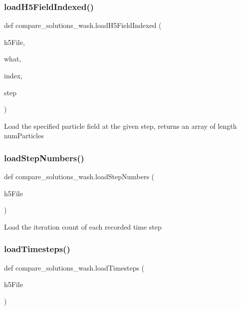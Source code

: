 \subsubsection{\texorpdfstring{load\+H5\+Field\+Indexed()}{loadH5FieldIndexed()}}
{\footnotesize\ttfamily def compare\+\_\+solutions\+\_\+wash.\+load\+H5\+Field\+Indexed (\begin{DoxyParamCaption}\item[{}]{h5\+File,  }\item[{}]{what,  }\item[{}]{index,  }\item[{}]{step }\end{DoxyParamCaption})}

\begin{DoxyVerb}Load the specified particle field at the given step, returns an array of length numParticles \end{DoxyVerb}
 \mbox{\label{namespacecompare__solutions__wash_a13dfad6bbc2ba1a437ee77253075b68a}} 
\subsubsection{\texorpdfstring{load\+Step\+Numbers()}{loadStepNumbers()}}
{\footnotesize\ttfamily def compare\+\_\+solutions\+\_\+wash.\+load\+Step\+Numbers (\begin{DoxyParamCaption}\item[{}]{h5\+File }\end{DoxyParamCaption})}

\begin{DoxyVerb}Load the iteration count of each recorded time step \end{DoxyVerb}
 \mbox{\label{namespacecompare__solutions__wash_a45f4b24054ceb028d7ca53bcdeefef5f}} 
\subsubsection{\texorpdfstring{load\+Timesteps()}{loadTimesteps()}}
{\footnotesize\ttfamily def compare\+\_\+solutions\+\_\+wash.\+load\+Timesteps (\begin{DoxyParamCaption}\item[{}]{h5\+File }\end{DoxyParamCaption})}


